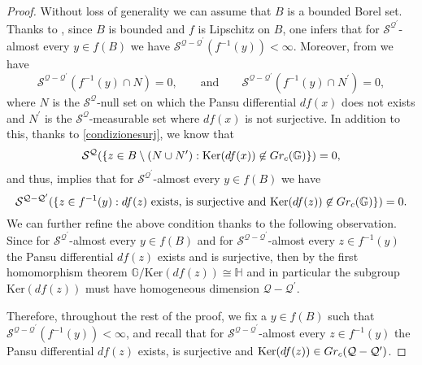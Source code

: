 \documentclass[10pt, a4paper,
oneside, headinclude,footinclude]{scrartcl}
\begin{document}
\begin{proof}
Without loss of generality we can assume that $B$ is a bounded Borel set. Thanks to \cite[Equation (9) and Proposition 1.12]{Magnanicoarea}, since $B$ is bounded and $f$ is Lipschitz on $B$, one infers that for $\mathcal{S}^{\mathcal{Q}^\prime}$-almost every $y\in f(B)$ we have $\mathcal{S}^{\mathcal{Q}-\mathcal{Q}^\prime}(f^{-1}(y))<\infty$. Moreover, from \cite[Theorem 2.6 and Theorem 2.7]{Magnanicoarea} we have
\begin{equation}
 \mathcal{S}^{\mathcal{Q}-\mathcal{Q}^\prime}(f^{-1}(y)\cap N)=0, \qquad\text{and}\qquad\mathcal{S}^{\mathcal{Q}-\mathcal{Q}^\prime}(f^{-1}(y)\cap N^\prime)=0,
    \label{cond:num1}
\end{equation}
where $N$ is the $\mathcal{S}^{\mathcal{Q}}$-null set on which the Pansu differential $df(x)$ does not exists and $N^\prime$ is the $\mathcal{S}^\mathcal{Q}$-measurable set where $df(x)$ is not surjective. In addition to this, thanks to \eqref{condizionesurj}, we know that
$$\mathcal{S}^{\mathcal{Q}}(\{z\in B\setminus (N\cup N^{\prime}):\mathrm{Ker}(df(x))\not\in Gr_c(\mathbb{G})\})=0,$$
and thus, \cite[Theorem 2.6]{Magnanicoarea} implies that for $\mathcal{S}^{\mathcal{Q}^\prime}$-almost every $y\in f(B)$
we have
\begin{equation}
\mathcal{S}^{\mathcal{Q}-\mathcal{Q}^\prime}(\{z\in f^{-1}(y): df(z) \text{ exists, is surjective and }\mathrm{Ker}(df(z))\not\in Gr_c(\mathbb{G})\})=0.
    \label{cond:num2}
\end{equation}
We can further refine the above condition thanks to the following observation. Since for $\mathcal{S}^{\mathcal{Q}^\prime}$-almost every $y\in f(B)$ and for $\mathcal{S}^{\mathcal{Q}-\mathcal{Q}^\prime}$-almost every $z\in f^{-1}(y)$ the Pansu differential $df(z)$ exists and is surjective, then by the first homomorphism theorem $\mathbb{G}/\mathrm{Ker}(df(z))\cong \mathbb{H}$ and in particular
the subgroup $\mathrm{Ker}(df(z))$ must have homogeneous dimension $\mathcal{Q}-\mathcal{Q}^\prime$. 

Therefore, throughout the rest of the proof, we fix a $y\in f(B)$ such that  $\mathcal{S}^{\mathcal{Q}-\mathcal{Q}^\prime}(f^{-1}(y))<\infty$, and recall that for $\mathcal{S}^{\mathcal{Q}-\mathcal{Q}^\prime}$-almost every $z\in f^{-1}(y)$ the Pansu differential $df(z)$ exists, is surjective and $\mathrm{Ker}(df(z))\in Gr_c(\mathcal{Q}-\mathcal{Q}^\prime)$.


\end{proof}
\end{document}
